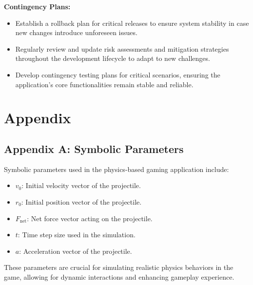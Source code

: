 \documentclass[12pt]{article}
\begin{document}
\textbf{Contingency Plans:}
\begin{itemize}
    \item Establish a rollback plan for critical releases to ensure system stability in case new changes introduce unforeseen issues.
    \item Regularly review and update risk assessments and mitigation strategies throughout the development lifecycle to adapt to new challenges.
    \item Develop contingency testing plans for critical scenarios, ensuring the application's core functionalities remain stable and reliable.
\end{itemize}

\section{Appendix}

\subsection{Appendix A: Symbolic Parameters}
Symbolic parameters used in the physics-based gaming application include:
\begin{itemize}
    \item \(v_0\): Initial velocity vector of the projectile.
    \item \(r_0\): Initial position vector of the projectile.
    \item \(F_{\text{net}}\): Net force vector acting on the projectile.
    \item \(t\): Time step size used in the simulation.
    \item \(a\): Acceleration vector of the projectile.
\end{itemize}
These parameters are crucial for simulating realistic physics behaviors in the game, allowing for dynamic interactions and enhancing gameplay experience.
\end{document}
